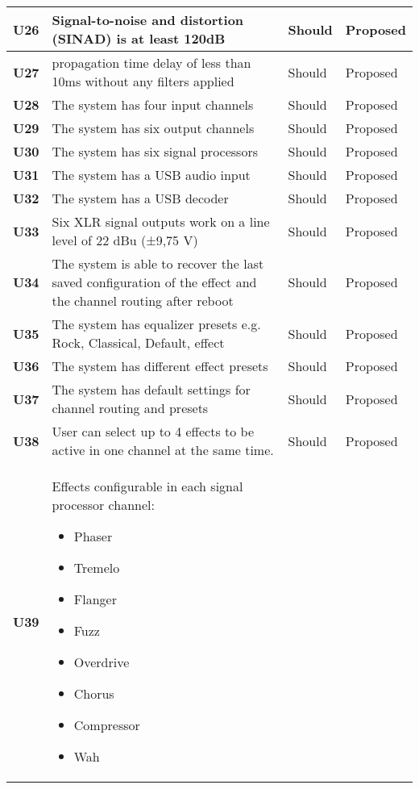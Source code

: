 \begin{longtable}{|l|p{10cm}|l|l|}
	\textbf{U26} &Signal-to-noise and distortion (SINAD) is at least 120dB 														& Should & Proposed\\ \hline
	\textbf{U27} &propagation time delay of less than 10ms without any filters applied 											& Should & Proposed\\ \hline
	\textbf{U28} &The system has four input channels 																			& Should & Proposed\\ \hline
	\textbf{U29} &The system has six output channels 																			& Should & Proposed\\ \hline
	\textbf{U30} &The system has six signal processors 																			& Should & Proposed\\ \hline
	\textbf{U31} &The system has a USB audio input					 															& Should & Proposed\\ \hline
	\textbf{U32} &The system has a USB decoder					 																& Should & Proposed\\ \hline
	\textbf{U33} &Six XLR signal outputs work on a line level of 22 dBu (±9,75 V) 												& Should & Proposed\\ \hline
	\textbf{U34} &The system is able to recover the last saved configuration of the effect and the channel routing after reboot	& Should & Proposed\\ \hline
	\textbf{U35} &The system has equalizer presets e.g. Rock, Classical, Default, effect		 								& Should & Proposed\\ \hline
	\textbf{U36} &The system has different effect presets										 								& Should & Proposed\\ \hline
	\textbf{U37} &The system has default settings for channel routing and presets							 					& Should & Proposed\\ \hline
	\textbf{U38} &User can select up to 4 effects to be active in one channel at the same time. 								& Should & Proposed\\ \hline
	\textbf{U39} &Effects configurable in each signal processor channel:\newline
	\begin{itemize}
		\setlength\itemsep{-0.3em}
		\item Phaser
		\item Tremelo
		\item Flanger
		\item Fuzz
		\item Overdrive
		\item Chorus
		\item Compressor
		\item Wah

\end{itemize}
\end{longtable}
